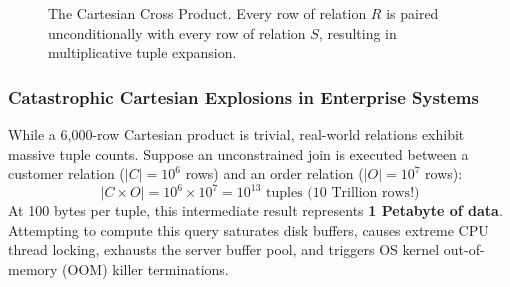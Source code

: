 \documentclass[10pt,twocolumn,letterpaper]{article}
\begin{document}
\begin{figure}[htbp]
\centering
{}
\caption{The Cartesian Cross Product. Every row of relation $R$ is paired unconditionally with every row of relation $S$, resulting in multiplicative tuple expansion.}
\label{fig:cartesian}
\end{figure}

\subsubsection{Catastrophic Cartesian Explosions in Enterprise Systems}
While a 6,000-row Cartesian product is trivial, real-world relations exhibit massive tuple counts. Suppose an unconstrained join is executed between a customer relation ($|C| = 10^6$ rows) and an order relation ($|O| = 10^7$ rows):
\begin{equation*}
|C \times O| = 10^6 \times 10^7 = 10^{13} \text{ tuples (10 Trillion rows!)}
\end{equation*}
At 100 bytes per tuple, this intermediate result represents \textbf{1 Petabyte of data}. Attempting to compute this query saturates disk buffers, causes extreme CPU thread locking, exhausts the server buffer pool, and triggers OS kernel out-of-memory (OOM) killer terminations.
\end{document}
